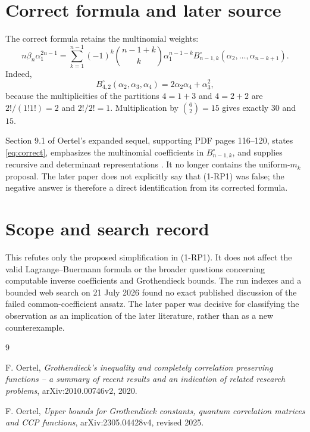 \documentclass[11pt]{article}
\begin{document}
\section*{Correct formula and later source}

The correct formula retains the multinomial weights:
\begin{equation}\label{eq:correct}
 n\beta_n\alpha_1^{2n-1}
 =\sum_{k=1}^{n-1}(-1)^k\binom{n-1+k}{k}
 \alpha_1^{n-1-k}B^{\circ}_{n-1,k}
 (\alpha_2,\ldots,\alpha_{n-k+1}).
\end{equation}
Indeed,
\[
B^{\circ}_{4,2}(\alpha_2,\alpha_3,\alpha_4)
=2\alpha_2\alpha_4+\alpha_3^2,
\]
because the multiplicities of the partitions $4=1+3$ and $4=2+2$ are
$2!/(1!1!)=2$ and $2!/2!=1$.  Multiplication by
$\binom62=15$ gives exactly $30$ and $15$.

Section 9.1 of Oertel's expanded sequel, supporting PDF pages 116--120,
states \eqref{eq:correct}, emphasizes the multinomial coefficients in
$B^{\circ}_{n-1,k}$, and supplies recursive and determinant representations
\cite{oertel2023}.  It no longer contains the uniform-$m_k$ proposal.  The
later paper does not explicitly say that (1-RP1) was false; the negative
answer is therefore a direct identification from its corrected formula.

\section*{Scope and search record}

This refutes only the proposed simplification in (1-RP1).  It does not affect
the valid Lagrange--Buermann formula or the broader questions concerning
computable inverse coefficients and Grothendieck bounds.  The run indexes and
a bounded web search on 21 July 2026 found no exact published discussion of
the failed common-coefficient ansatz.  The later paper was decisive for
classifying the observation as an implication of the later literature,
rather than as a new counterexample.

\begin{thebibliography}{9}

F. Oertel,
\emph{Grothendieck's inequality and completely correlation preserving
functions -- a summary of recent results and an indication of related
research problems}, arXiv:2010.00746v2, 2020.

F. Oertel,
\emph{Upper bounds for Grothendieck constants, quantum correlation matrices
and CCP functions}, arXiv:2305.04428v4, revised 2025.

\end{thebibliography}
\end{document}
